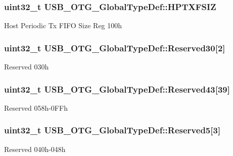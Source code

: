 \subsubsection[{\texorpdfstring{H\+P\+T\+X\+F\+S\+IZ}{HPTXFSIZ}}]{ uint32\+\_\+t U\+S\+B\+\_\+\+O\+T\+G\+\_\+\+Global\+Type\+Def\+::\+H\+P\+T\+X\+F\+S\+IZ}\hypertarget{struct_u_s_b___o_t_g___global_type_def_ad50445f076f99e6b3d0cfb2643f40fac}{}\label{struct_u_s_b___o_t_g___global_type_def_ad50445f076f99e6b3d0cfb2643f40fac}
Host Periodic Tx F\+I\+FO Size Reg 100h 
\subsubsection[{\texorpdfstring{Reserved30}{Reserved30}}]{\setlength{\rightskip}{0pt plus 5cm}uint32\+\_\+t U\+S\+B\+\_\+\+O\+T\+G\+\_\+\+Global\+Type\+Def\+::\+Reserved30\mbox{[}2\mbox{]}}\hypertarget{struct_u_s_b___o_t_g___global_type_def_a978a73c27d2afe65def81f28b881e138}{}\label{struct_u_s_b___o_t_g___global_type_def_a978a73c27d2afe65def81f28b881e138}
Reserved 030h 
\subsubsection[{\texorpdfstring{Reserved43}{Reserved43}}]{\setlength{\rightskip}{0pt plus 5cm}uint32\+\_\+t U\+S\+B\+\_\+\+O\+T\+G\+\_\+\+Global\+Type\+Def\+::\+Reserved43\mbox{[}39\mbox{]}}\hypertarget{struct_u_s_b___o_t_g___global_type_def_a6b4535e29851579814466353a0714ad4}{}\label{struct_u_s_b___o_t_g___global_type_def_a6b4535e29851579814466353a0714ad4}
Reserved 058h-\/0\+F\+Fh 
\subsubsection[{\texorpdfstring{Reserved5}{Reserved5}}]{\setlength{\rightskip}{0pt plus 5cm}uint32\+\_\+t U\+S\+B\+\_\+\+O\+T\+G\+\_\+\+Global\+Type\+Def\+::\+Reserved5\mbox{[}3\mbox{]}}\hypertarget{struct_u_s_b___o_t_g___global_type_def_a09a6f110e580becd4050cf67f93c4908}{}\label{struct_u_s_b___o_t_g___global_type_def_a09a6f110e580becd4050cf67f93c4908}
Reserved 040h-\/048h 
